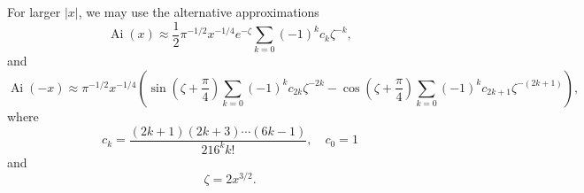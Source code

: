 \documentclass[]{article}
\renewcommand{\mod}[1]{\ensuremath{\lvert {#1} \rvert}}
\newcommand{\Ai}[1]{\ensuremath{\operatorname{Ai}({#1})}}
\begin{document}
For larger $\mod{x}$, we may use the alternative approximations
\[
\Ai{x} \approx \frac{1}{2}\pi^{-1/2}x^{-1/4}e^{-\zeta} \sum\limits_{k=0} (-1)^{k}c_{k}\zeta^{-k},
\]
and
\[
\Ai{-x} \approx \pi^{-1/2}x^{-1/4}\left (
	\sin{(\zeta + \frac{\pi}{4})}\sum\limits_{k=0}(-1)^{k}c_{2k}\zeta^{-2k} -
	\cos{(\zeta + \frac{\pi}{4})}\sum\limits_{k=0}(-1)^{k}c_{2k+1}\zeta^{-(2k+1)}
\right ),
\]
where
\[
c_{k} = \frac{(2k+1)(2k+3)\dotsb(6k-1)}{216^{k}k!}, \quad c_{0} = 1
\]
and
\[
\zeta = 2x^{3/2}.
\]

\begin{thebibliography}{9}
\end{thebibliography}
\end{document}
